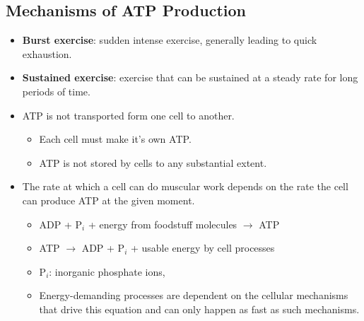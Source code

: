 \documentclass[12pt,a4paper]{article}
\begin{document}
\subsection{Mechanisms of ATP Production}
\begin{itemize}
    \item \textbf{Burst exercise}: sudden intense exercise, generally leading to quick exhaustion.
    \item \textbf{Sustained exercise}: exercise that can be sustained at a steady rate for long periods of time.
    \item ATP is not transported form one cell to another.
        \begin{itemize}
            \item {\color{o-Sun}Each cell must make it's own ATP}.
            \item {\color{o-Sun}ATP is not stored by cells to any substantial extent}.
        \end{itemize}
    \item The rate at which a cell can do muscular work depends on the rate the cell can produce ATP at the given moment.
        \begin{itemize}
            \item ADP + P\(_{i}\) + energy from foodstuff molecules \(\rightarrow\) ATP
            \item ATP \(\rightarrow\) ADP + P\(_{i}\) + usable energy by cell processes
            \item P\(_{i}\): inorganic phosphate ions, {\color{neg}}
            \item Energy-demanding processes are dependent on the cellular mechanisms that drive this equation and can only happen as fast as such mechanisms.
        \end{itemize}

\end{itemize}
\end{document}
